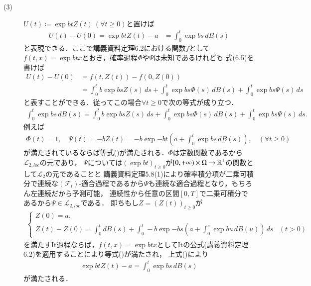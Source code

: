\begin{description}
	\item[(3)] 
		$U(t) \coloneqq \exp{bt}Z(t)\ (\forall t \geq 0)$と置けば
		\begin{align}
			U(t) - U(0) = \exp{bt}Z(t) - a &= \int_{0}^{t} \exp{bs}\, dB(s)
		\end{align}
		と表現できる．ここで講義資料定理6.2における関数$f$として$f(t,x) = \exp{bt}x$とおき，確率過程$\Phi$や$\Psi$は未知であるけれども
		式(6.5)を書けば
		\begin{align}
			U(t) - U(0) &= f(t,Z(t)) - f(0, Z(0)) \\
			&= \int_{0}^{t} b\exp{bs}Z(s)\, ds + \int_{0}^{t} \exp{bs}\Phi(s)\, dB(s) + \int_{0}^{t} \exp{bs}\Psi(s)\, ds
			\label{eq:stoc_report_Q3_1}
		\end{align}
		と表すことができる．従ってこの場合$\forall t \geq 0$で次の等式が成り立つ．
		\begin{align}
			\int_{0}^{t} \exp{bs}\, dB(s) 
			= \int_{0}^{t} b\exp{bs}Z(s)\, ds + \int_{0}^{t} \exp{bs}\Phi(s)\, dB(s) + \int_{0}^{t} \exp{bs}\Psi(s)\, ds.
			\label{eq:stoc_report_Q3_2}
		\end{align}
		例えば
		\begin{align}
			\Phi(t) = 1,\quad \Psi(t) = -bZ(t) = -b\exp{-bt} \left(a + \int_{0}^{t} \exp{bs}\, dB(s) \right), \quad(\forall t \geq 0)
		\end{align}
		が満たされているならば等式()が満たされる．$\Phi$は定数関数であるから$\mathcal{L}_{2,loc}$の元であり，
		$\Psi$については$(\exp{bt})_{t \geq 0}$が$[0, +\infty) \times \Omega \rightarrow \mathbb{R}^1$の関数として$\mathcal{L}_2$の元であることと
		講義資料定理5.8(1)により確率積分項が二乗可積分で連続な$(\mathcal{F}_t)$-適合過程であるから$\Psi$も連続な適合過程となり，もちろん左連続だから予測可能，
		連続性から任意の区間$[0,T]$で二乗可積分であるから$\Psi \in \mathcal{L}_{2,loc}$である．
		即ちもし$Z = (Z(t))_{t \geq 0}$が
		\begin{align}
			\begin{cases}
				Z(0) = a, & \\
				Z(t) - Z(0) = \int_{0}^{t} dB(s) + \int_{0}^{t} -b\exp{-bs} \left(a + \int_{0}^{s} \exp{bu}\, dB(u) \right)\, ds & (t > 0)
			\end{cases}
		\end{align}
		を満たすIt過程ならば，$f(t,x) = \exp{bt}x$としてItの公式(講義資料定理6.2)を適用することにより等式()が満たされ，
		上式()により
		\begin{align}
			\exp{bt}Z(t) - a = \int_{0}^{t} \exp{bs}\, dB(s) 
		\end{align}
		が満たされる．
\end{description}